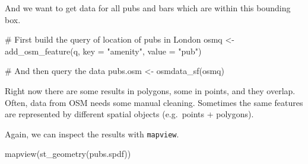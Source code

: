 \documentclass[
  letterpaper,
  DIV=11,
  numbers=noendperiod]{scrreprt}
\newenvironment{Shaded}{\begin{snugshade}}{\end{snugshade}}
\newcommand{\AttributeTok}[1]{\textcolor[rgb]{0.40,0.45,0.13}{#1}}
\newcommand{\CommentTok}[1]{\textcolor[rgb]{0.37,0.37,0.37}{#1}}
\newcommand{\FunctionTok}[1]{\textcolor[rgb]{0.28,0.35,0.67}{#1}}
\newcommand{\NormalTok}[1]{\textcolor[rgb]{0.00,0.23,0.31}{#1}}
\newcommand{\OtherTok}[1]{\textcolor[rgb]{0.00,0.23,0.31}{#1}}
\newcommand{\SpecialCharTok}[1]{\textcolor[rgb]{0.37,0.37,0.37}{#1}}
\newcommand{\StringTok}[1]{\textcolor[rgb]{0.13,0.47,0.30}{#1}}
\begin{document}
And we want to get data for all pubs and bars which are within this
bounding box.

\begin{Shaded}
\begin{Highlighting}[]
\CommentTok{\# First build the query of location of pubs in London}
\NormalTok{osmq }\OtherTok{\textless{}{-}} \FunctionTok{add\_osm\_feature}\NormalTok{(q, }\AttributeTok{key =} \StringTok{"amenity"}\NormalTok{, }\AttributeTok{value =} \StringTok{"pub"}\NormalTok{)}

\CommentTok{\# And then query the data}
\NormalTok{pubs.osm }\OtherTok{\textless{}{-}} \FunctionTok{osmdata\_sf}\NormalTok{(osmq)}
\end{Highlighting}
\end{Shaded}

Right now there are some results in polygons, some in points, and they
overlap. Often, data from OSM needs some manual cleaning. Sometimes the
same features are represented by different spatial objects (e.g.~points
+ polygons).

\begin{Shaded}
\end{Shaded}

Again, we can inspect the results with \texttt{mapview}.

\begin{Shaded}
\begin{Highlighting}[]
\FunctionTok{mapview}\NormalTok{(}\FunctionTok{st\_geometry}\NormalTok{(pubs.spdf))}
\end{Highlighting}
\end{Shaded}
\end{document}
